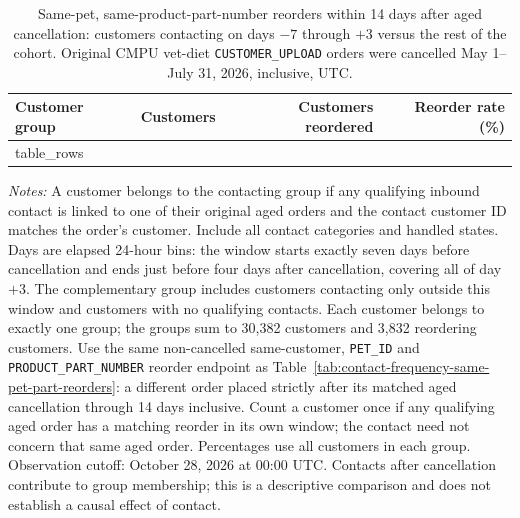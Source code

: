 \begin{table}[!htbp]
\centering
\caption{Same-pet, same-product-part-number reorders within 14 days after aged cancellation: customers contacting on days $-7$ through $+3$ versus the rest of the cohort. Original CMPU vet-diet \texttt{CUSTOMER\_UPLOAD} orders were cancelled May 1--July 31, 2026, inclusive, UTC.}
\label{tab:contact-window-same-pet-part-reorders}
\begin{tabular}{@{}lrrr@{}}
\toprule
Customer group & Customers & Customers reordered & Reorder rate (\%) \\
\midrule
{{ table_rows }}
\bottomrule
\end{tabular}

\begin{minipage}{\linewidth}
\footnotesize
\textit{Notes:} A customer belongs to the contacting group if any qualifying
inbound contact is linked to one of their original aged orders and the contact
customer ID matches the order's customer. Include all contact categories and
handled states. Days are elapsed 24-hour bins: the window starts exactly seven
days before cancellation and ends just before four days after cancellation,
covering all of day $+3$. The complementary group includes customers contacting
only outside this window and customers with no qualifying contacts. Each
customer belongs to exactly one group; the groups sum to 30,382 customers and
3,832 reordering customers. Use the same non-cancelled same-customer,
\texttt{PET\_ID} and \texttt{PRODUCT\_PART\_NUMBER} reorder endpoint as
Table~\ref{tab:contact-frequency-same-pet-part-reorders}: a different order
placed strictly after its matched aged cancellation through 14 days inclusive.
Count a customer once if any qualifying aged order has a matching reorder in
its own window; the contact need not concern that same aged order. Percentages
use all customers in each group. Observation cutoff: October 28, 2026 at 00:00
UTC. Contacts after cancellation contribute to group membership; this is a
descriptive comparison and does not establish a causal effect of contact.
\end{minipage}
\end{table}
